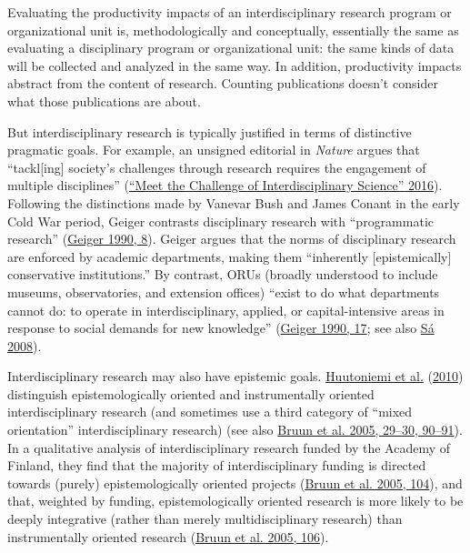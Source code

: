 \documentclass[
  11pt,
]{article}
\begin{document}
\label{sec.discursive}

Evaluating the productivity impacts of an interdisciplinary research program or organizational unit is, methodologically and conceptually, essentially the same as evaluating a disciplinary program or organizational unit: the same kinds of data will be collected and analyzed in the same way. In addition, productivity impacts abstract from the content of research. Counting publications doesn't consider what those publications are about.

But interdisciplinary research is typically justified in terms of distinctive pragmatic goals. For example, an unsigned editorial in \emph{Nature} argues that ``tackl{[}ing{]} society's challenges through research requires the engagement of multiple disciplines'' (\protect\hyperlink{ref-MeetChallengeInterdisciplinary2016}{{``Meet the Challenge of Interdisciplinary Science''} 2016}). Following the distinctions made by Vanevar Bush and James Conant in the early Cold War period, Geiger contrasts disciplinary research with ``programmatic research'' (\protect\hyperlink{ref-GeigerOrganizedResearchUnits1990}{Geiger 1990, 8}). Geiger argues that the norms of disciplinary research are enforced by academic departments, making them ``inherently {[}epistemically{]} conservative institutions.'' By contrast, ORUs (broadly understood to include museums, observatories, and extension offices) ``exist to do what departments cannot do: to operate in interdisciplinary, applied, or capital-intensive areas in response to social demands for new knowledge'' (\protect\hyperlink{ref-GeigerOrganizedResearchUnits1990}{Geiger 1990, 17}; see also \protect\hyperlink{ref-SaInterdisciplinaryStrategiesResearch2008}{Sá 2008}).

Interdisciplinary research may also have epistemic goals. \protect\hyperlink{ref-HuutoniemiAnalyzingInterdisciplinarityTypology2010}{Huutoniemi et al.} (\protect\hyperlink{ref-HuutoniemiAnalyzingInterdisciplinarityTypology2010}{2010}) distinguish epistemologically oriented and instrumentally oriented interdisciplinary research (and sometimes use a third category of ``mixed orientation'' interdisciplinary research) (see also \protect\hyperlink{ref-BruunPromotingInterdisciplinaryResearch2005}{Bruun et al. 2005, 29--30, 90--91}). In a qualitative analysis of interdisciplinary research funded by the Academy of Finland, they find that the majority of interdisciplinary funding is directed towards (purely) epistemologically oriented projects (\protect\hyperlink{ref-BruunPromotingInterdisciplinaryResearch2005}{Bruun et al. 2005, 104}), and that, weighted by funding, epistemologically oriented research is more likely to be deeply integrative (rather than merely multidisciplinary research) than instrumentally oriented research (\protect\hyperlink{ref-BruunPromotingInterdisciplinaryResearch2005}{Bruun et al. 2005, 106}).
\end{document}
